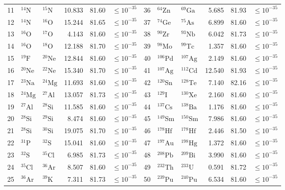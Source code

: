 \documentclass[11pt,onecolumn]{article}
\begin{document}
\begin{table}[!htbp]
{\begin{tabular}{@{}r l l r r c | r l l r r c@{}}
11 & $^{14}\text{N}$ & $^{15}\text{N}$ & 10.833 & 81.60 & $\le 10^{-35}$ & 36 & $^{64}\text{Zn}$ & $^{69}\text{Ga}$ & 5.685 & 81.93 & $\le 10^{-35}$ \\
12 & $^{14}\text{N}$ & $^{16}\text{O}$ & 15.244 & 81.65 & $\le 10^{-35}$ & 37 & $^{74}\text{Ge}$ & $^{75}\text{As}$ & 6.899 & 81.60 & $\le 10^{-35}$ \\
13 & $^{16}\text{O}$ & $^{17}\text{O}$ & 4.143 & 81.60 & $\le 10^{-35}$ & 38 & $^{90}\text{Zr}$ & $^{93}\text{Nb}$ & 6.042 & 81.73 & $\le 10^{-35}$ \\
14 & $^{16}\text{O}$ & $^{18}\text{O}$ & 12.188 & 81.70 & $\le 10^{-35}$ & 39 & $^{98}\text{Mo}$ & $^{99}\text{Tc}$ & 1.357 & 81.60 & $\le 10^{-35}$ \\
15 & $^{19}\text{F}$ & $^{20}\text{Ne}$ & 12.844 & 81.60 & $\le 10^{-35}$ & 40 & $^{106}\text{Pd}$ & $^{107}\text{Ag}$ & 2.149 & 81.60 & $\le 10^{-35}$ \\
16 & $^{20}\text{Ne}$ & $^{22}\text{Ne}$ & 15.340 & 81.70 & $\le 10^{-35}$ & 41 & $^{107}\text{Ag}$ & $^{112}\text{Cd}$ & 12.540 & 81.93 & $\le 10^{-35}$ \\
17 & $^{23}\text{Na}$ & $^{24}\text{Mg}$ & 11.693 & 81.60 & $\le 10^{-35}$ & 42 & $^{120}\text{Sn}$ & $^{128}\text{Te}$ & 7.140 & 82.16 & $\le 10^{-35}$ \\
18 & $^{24}\text{Mg}$ & $^{27}\text{Al}$ & 13.057 & 81.73 & $\le 10^{-35}$ & 43 & $^{129}\text{I}$ & $^{130}\text{Xe}$ & 2.160 & 81.60 & $\le 10^{-35}$ \\
19 & $^{27}\text{Al}$ & $^{28}\text{Si}$ & 11.585 & 81.60 & $\le 10^{-35}$ & 44 & $^{137}\text{Cs}$ & $^{138}\text{Ba}$ & 1.176 & 81.60 & $\le 10^{-35}$ \\
20 & $^{28}\text{Si}$ & $^{29}\text{Si}$ & 8.474 & 81.60 & $\le 10^{-35}$ & 45 & $^{149}\text{Sm}$ & $^{150}\text{Sm}$ & 7.986 & 81.60 & $\le 10^{-35}$ \\
21 & $^{28}\text{Si}$ & $^{30}\text{Si}$ & 19.075 & 81.70 & $\le 10^{-35}$ & 46 & $^{178}\text{Hf}$ & $^{178}\text{Hf}$ & 2.446 & 81.50 & $\le 10^{-35}$ \\
22 & $^{31}\text{P}$ & $^{32}\text{S}$ & 15.041 & 81.60 & $\le 10^{-35}$ & 47 & $^{197}\text{Au}$ & $^{198}\text{Hg}$ & 1.372 & 81.60 & $\le 10^{-35}$ \\
23 & $^{32}\text{S}$ & $^{35}\text{Cl}$ & 6.985 & 81.73 & $\le 10^{-35}$ & 48 & $^{208}\text{Pb}$ & $^{209}\text{Bi}$ & 3.990 & 81.60 & $\le 10^{-35}$ \\
24 & $^{35}\text{Cl}$ & $^{36}\text{Ar}$ & 8.507 & 81.60 & $\le 10^{-35}$ & 49 & $^{232}\text{Th}$ & $^{233}\text{U}$ & 0.591 & 81.72 & $\le 10^{-35}$ \\
25 & $^{36}\text{Ar}$ & $^{39}\text{K}$ & 7.311 & 81.73 & $\le 10^{-35}$ & 50 & $^{239}\text{Pu}$ & $^{240}\text{Pu}$ & 6.534 & 81.60 & $\le 10^{-35}$ \\
\bottomrule
\end{tabular}%
}
\end{table}
\FloatBarrier
\end{document}
